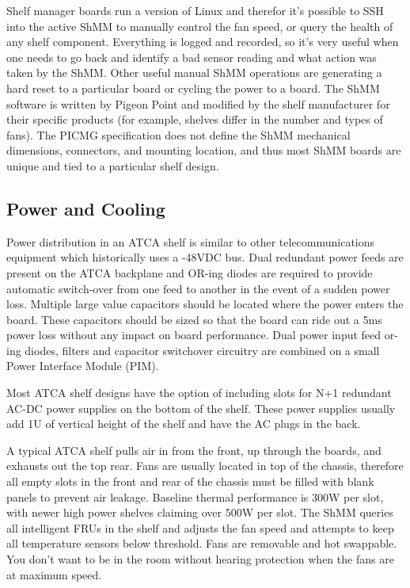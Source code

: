 \documentclass[letterpaper]{article}
\begin{document}
Shelf manager boards run a version of Linux and therefor it's possible to SSH into the active ShMM to manually control the fan speed, or query the health of any shelf component.  Everything is logged and recorded, so it's very useful when one needs to go back and identify a bad sensor reading and what action was taken by the ShMM.  Other useful manual ShMM operations are generating a hard reset to a particular board or cycling the power to a board.  The ShMM software is written by Pigeon Point and modified by the shelf manufacturer for their specific products (for example, shelves differ in the number and types of fans).  The PICMG specification does not define the ShMM mechanical dimensions, connectors, and mounting location, and thus most ShMM boards are unique and tied to a particular shelf design.

\subsection{Power and Cooling}

Power distribution in an ATCA shelf is similar to other telecommunications equipment which historically uses a -48VDC bus.  Dual redundant power feeds are present on the ATCA backplane and OR-ing diodes are required to provide automatic switch-over from one feed to another in the event of a sudden power loss.  Multiple large value capacitors should be located where the power enters the board.  These capacitors should be sized so that the board can ride out a 5ms power loss without any impact on board performance.  Dual power input feed or-ing diodes, filters and capacitor switchover circuitry are combined on a small Power Interface Module (PIM).

Most ATCA shelf designs have the option of including slots for N+1 redundant AC-DC power supplies on the bottom of the shelf.  These power supplies usually add 1U of vertical height of the shelf and have the AC plugs in the back.

A typical ATCA shelf pulls air in from the front, up through the boards, and exhausts out the top rear.  Fans are usually located in top of the chassis, therefore all empty slots in the front and rear of the chassis must be filled with blank panels to prevent air leakage.  Baseline thermal performance is 300W per slot, with newer high power shelves claiming over 500W per slot.  The ShMM queries all intelligent FRUs in the shelf and adjusts the fan speed and attempts to keep all temperature sensors below threshold.  Fans are removable and hot swappable.  You don't want to be in the room without hearing protection when the fans are at maximum speed.
\end{document}

